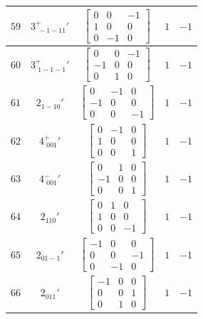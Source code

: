 \documentclass[fleqn,8pt]{jsarticle}
\begin{document}
\begin{longtable}{ccccc}
$ 59 $ & $ 3^{+}_{\,\,-1-11}{}' $ & $ \begin{bmatrix} 0 & 0 & -1 \\ 1 & 0 & 0 \\ 0 & -1 & 0 \end{bmatrix} $ & $ 1 $ & $ -1 $ \\ \hline
$ 60 $ & $ 3^{+}_{\,\,1-1-1}{}' $ & $ \begin{bmatrix} 0 & 0 & -1 \\ -1 & 0 & 0 \\ 0 & 1 & 0 \end{bmatrix} $ & $ 1 $ & $ -1 $ \\ \hline
$ 61 $ & $ 2{}_{1-10}{}' $ & $ \begin{bmatrix} 0 & -1 & 0 \\ -1 & 0 & 0 \\ 0 & 0 & -1 \end{bmatrix} $ & $ 1 $ & $ -1 $ \\ \hline
$ 62 $ & $ 4^{+}_{\,\,001}{}' $ & $ \begin{bmatrix} 0 & -1 & 0 \\ 1 & 0 & 0 \\ 0 & 0 & 1 \end{bmatrix} $ & $ 1 $ & $ -1 $ \\ \hline
$ 63 $ & $ 4^{-}_{\,\,001}{}' $ & $ \begin{bmatrix} 0 & 1 & 0 \\ -1 & 0 & 0 \\ 0 & 0 & 1 \end{bmatrix} $ & $ 1 $ & $ -1 $ \\ \hline
$ 64 $ & $ 2{}_{110}{}' $ & $ \begin{bmatrix} 0 & 1 & 0 \\ 1 & 0 & 0 \\ 0 & 0 & -1 \end{bmatrix} $ & $ 1 $ & $ -1 $ \\ \hline
$ 65 $ & $ 2{}_{01-1}{}' $ & $ \begin{bmatrix} -1 & 0 & 0 \\ 0 & 0 & -1 \\ 0 & -1 & 0 \end{bmatrix} $ & $ 1 $ & $ -1 $ \\ \hline
$ 66 $ & $ 2{}_{011}{}' $ & $ \begin{bmatrix} -1 & 0 & 0 \\ 0 & 0 & 1 \\ 0 & 1 & 0 \end{bmatrix} $ & $ 1 $ & $ -1 $ \\ \hline

\end{longtable}
\end{document}

